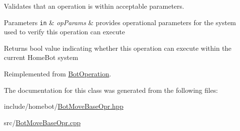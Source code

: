 Validates that an operation is within acceptable parameters. 


\begin{DoxyParams}[1]{Parameters}
\mbox{\tt in}  & {\em op\-Params} & provides operational parameters for the system used to verify this operation can execute \\
\hline
\end{DoxyParams}
\begin{DoxyReturn}{Returns}
bool value indicating whether this operation can execute within the current Home\-Bot system 
\end{DoxyReturn}


Reimplemented from \hyperlink{classBotOperation_a0ed080d4c88b9ee0422666de169fb4a6}{Bot\-Operation}.



The documentation for this class was generated from the following files\-:\begin{DoxyCompactItemize}
\item 
include/homebot/\hyperlink{BotMoveBaseOpr_8hpp}{Bot\-Move\-Base\-Opr.\-hpp}\item 
src/\hyperlink{BotMoveBaseOpr_8cpp}{Bot\-Move\-Base\-Opr.\-cpp}\end{DoxyCompactItemize}
